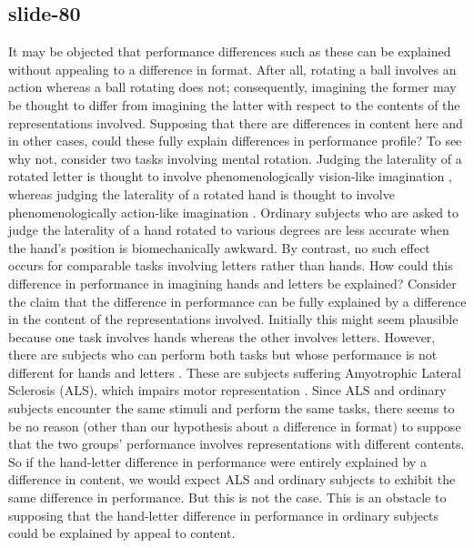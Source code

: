 \documentclass[12pt,\papersize]{extarticle}
\begin{document}
\subsection{slide-80}
It may be objected that performance differences such as these can be explained without appealing to
a difference in format. After all, rotating a ball involves an action whereas a ball rotating does
not; consequently, imagining the former may be thought to differ from imagining the latter with
respect to the contents of the representations involved. Supposing that there are differences in
content here and in other cases, could these fully explain differences in performance profile? To
see why not, consider two tasks involving mental rotation. Judging the laterality of a rotated
letter is thought to involve phenomenologically vision-like imagination
\citep{jordan:2001_cortical}, whereas judging the laterality of a rotated hand is thought to involve
phenomenologically action-like imagination \citep{parsons:1987_imagined, gentilucci:1998_right}.
Ordinary subjects who are asked to judge the laterality of a hand rotated to various degrees are
less accurate when the hand's position is biomechanically awkward. By contrast, no such effect
occurs for comparable tasks involving letters rather than hands. How could this difference in
performance in imagining hands and letters be explained? Consider the claim that the difference in
performance can be fully explained by a difference in the content of the representations involved.
Initially this might seem plausible because one task involves hands whereas the other involves
letters. However, there are subjects who can perform both tasks but whose performance is not
different for hands and letters \citep{Fiori:2012fk}. These are subjects suffering Amyotrophic
Lateral Sclerosis (ALS), which impairs motor representation \citep{parsons:1998_cerebrally}. Since
ALS and ordinary subjects encounter the same stimuli and perform the same tasks, there seems to be
no reason (other than our hypothesis about a difference in format) to suppose that the two groups'
performance involves representations with different contents. So if the hand-letter difference in
performance were entirely explained by a difference in content, we would expect ALS and ordinary
subjects to exhibit the same difference in performance. But this is not the case. This is an
obstacle to supposing that the hand-letter difference in performance in ordinary subjects could be
explained by appeal to content.
 
\end{document}
